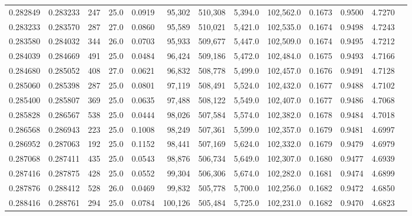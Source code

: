\begin{tabular}{rrrrrrrrrrrrr}
0.282849 & 0.283233 &   247 & 25.0 &                                     0.0919 &  95,302 & 510,308 &   5,394.0 & 102,562.0 & 0.1673 & 0.9500 & 4.7270 \\
0.283233 & 0.283570 &   287 & 27.0 &                                     0.0860 &  95,589 & 510,021 &   5,421.0 & 102,535.0 & 0.1674 & 0.9498 & 4.7243 \\
0.283580 & 0.284032 &   344 & 26.0 &                                     0.0703 &  95,933 & 509,677 &   5,447.0 & 102,509.0 & 0.1674 & 0.9495 & 4.7212 \\
0.284039 & 0.284669 &   491 & 25.0 &                                     0.0484 &  96,424 & 509,186 &   5,472.0 & 102,484.0 & 0.1675 & 0.9493 & 4.7166 \\
0.284680 & 0.285052 &   408 & 27.0 &                                     0.0621 &  96,832 & 508,778 &   5,499.0 & 102,457.0 & 0.1676 & 0.9491 & 4.7128 \\
0.285060 & 0.285398 &   287 & 25.0 &                                     0.0801 &  97,119 & 508,491 &   5,524.0 & 102,432.0 & 0.1677 & 0.9488 & 4.7102 \\
0.285400 & 0.285807 &   369 & 25.0 &                                     0.0635 &  97,488 & 508,122 &   5,549.0 & 102,407.0 & 0.1677 & 0.9486 & 4.7068 \\
0.285828 & 0.286567 &   538 & 25.0 &                                     0.0444 &  98,026 & 507,584 &   5,574.0 & 102,382.0 & 0.1678 & 0.9484 & 4.7018 \\
0.286568 & 0.286943 &   223 & 25.0 &                                     0.1008 &  98,249 & 507,361 &   5,599.0 & 102,357.0 & 0.1679 & 0.9481 & 4.6997 \\
0.286952 & 0.287063 &   192 & 25.0 &                                     0.1152 &  98,441 & 507,169 &   5,624.0 & 102,332.0 & 0.1679 & 0.9479 & 4.6979 \\
0.287068 & 0.287411 &   435 & 25.0 &                                     0.0543 &  98,876 & 506,734 &   5,649.0 & 102,307.0 & 0.1680 & 0.9477 & 4.6939 \\
0.287416 & 0.287875 &   428 & 25.0 &                                     0.0552 &  99,304 & 506,306 &   5,674.0 & 102,282.0 & 0.1681 & 0.9474 & 4.6899 \\
0.287876 & 0.288412 &   528 & 26.0 &                                     0.0469 &  99,832 & 505,778 &   5,700.0 & 102,256.0 & 0.1682 & 0.9472 & 4.6850 \\
0.288416 & 0.288761 &   294 & 25.0 &                                     0.0784 & 100,126 & 505,484 &   5,725.0 & 102,231.0 & 0.1682 & 0.9470 & 4.6823 \\

\end{tabular}
